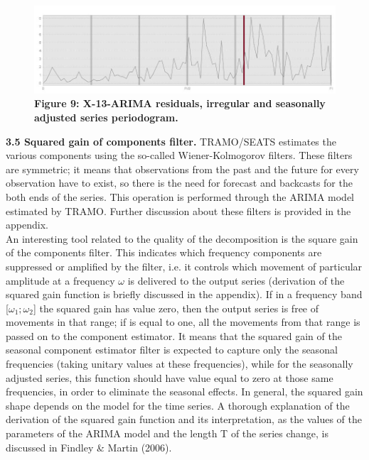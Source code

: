 \documentclass{article}
\begin{document}
\begin{figure}[H]
  \includegraphics[width=\linewidth]{../images/capitolo3/XperSA.jpg} 
   {\textbf{\scriptsize Figure 9:  X-13-ARIMA residuals, irregular and seasonally adjusted series periodogram. }}
\end{figure}
\textbf{\small 3.5 Squared gain of components filter.}
TRAMO/SEATS estimates the various components using the so-called Wiener-Kolmogorov filters. These filters are symmetric; it means that observations from the past and the future for every observation have to exist, so there is the need for forecast and backcasts for the both ends of the series. This operation is performed through the ARIMA model estimated by TRAMO. Further discussion about these filters is provided in the appendix.\\ An interesting tool related to the quality of the decomposition is the square gain of the components filter. This indicates which frequency components are suppressed or amplified by the filter, i.e. it controls which movement of particular amplitude at a frequency $\omega$ is delivered to the output series (derivation of the squared gain function is briefly discussed in the appendix). If in a frequency band [$\omega_{1};\omega_{2}$] the squared gain has value zero, then the output series is free of movements in that range; if is equal to one, all the movements from that range is passed on to the component estimator. It means that the squared gain of the seasonal component estimator filter is expected to capture only the seasonal frequencies (taking unitary values at these frequencies), while for the seasonally adjusted series, this function should have value equal to zero at those same frequencies, in order to eliminate the seasonal effects. In general, the squared gain shape depends on the model for the time series. A thorough explanation of the derivation of the squared gain function and its interpretation, as the values of the parameters of the ARIMA model and the length T of the series change, is discussed in Findley \& Martin (2006).
\end{document}
